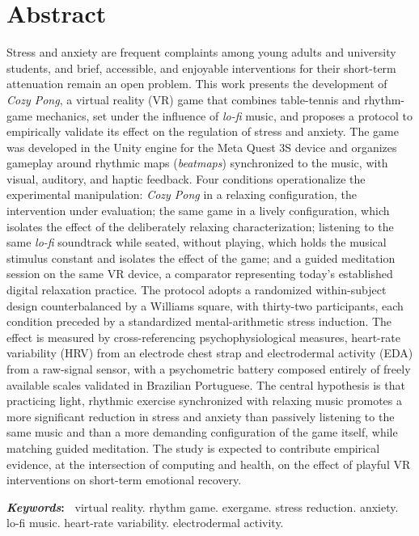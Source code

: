 \chapter*{Abstract}


Stress and anxiety are frequent complaints among young adults and university students, and brief, accessible, and enjoyable interventions for their short-term attenuation remain an open problem. This work presents the development of \textit{Cozy Pong}, a virtual reality (VR) game that combines table-tennis and rhythm-game mechanics, set under the influence of \textit{lo-fi} music, and proposes a protocol to empirically validate its effect on the regulation of stress and anxiety. The game was developed in the Unity engine for the Meta Quest 3S device and organizes gameplay around rhythmic maps (\textit{beatmaps}) synchronized to the music, with visual, auditory, and haptic feedback. Four conditions operationalize the experimental manipulation: \textit{Cozy Pong} in a relaxing configuration, the intervention under evaluation; the same game in a lively configuration, which isolates the effect of the deliberately relaxing characterization; listening to the same \textit{lo-fi} soundtrack while seated, without playing, which holds the musical stimulus constant and isolates the effect of the game; and a guided meditation session on the same VR device, a comparator representing today's established digital relaxation practice. The protocol adopts a randomized within-subject design counterbalanced by a Williams square, with thirty-two participants, each condition preceded by a standardized mental-arithmetic stress induction. The effect is measured by cross-referencing psychophysiological measures, heart-rate variability (HRV) from an electrode chest strap and electrodermal activity (EDA) from a raw-signal sensor, with a psychometric battery composed entirely of freely available scales validated in Brazilian Portuguese. The central hypothesis is that practicing light, rhythmic exercise synchronized with relaxing music promotes a more significant reduction in stress and anxiety than passively listening to the same music and than a more demanding configuration of the game itself, while matching guided meditation.   The study is expected to contribute empirical evidence, at the intersection of computing and health, on the effect of playful VR interventions on short-term emotional recovery.

\vspace{1em}
\noindent\textbf{\textit{Keywords}:~} virtual reality. rhythm game. exergame. stress reduction. anxiety. lo-fi music. heart-rate variability. electrodermal activity.

